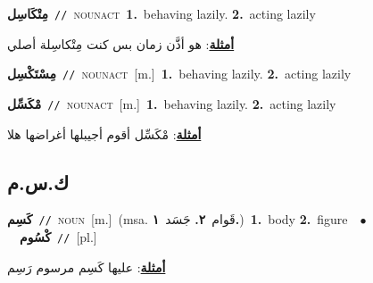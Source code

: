 \documentclass[10pt,a4paper,twoside]{article} %
\begin{document}
\begin{multicols}{2}
{\setlength\topsep{0pt}\textbf{\foreignlanguage{arabic}{مِتْكَاسِل}}\ {\color{gray}\texttt{//}\color{black}}\ \textsc{noun\textunderscore act}\ \textbf{1.}~behaving lazily.  \textbf{2.}~acting lazily\  \begin{flushright}\color{gray}\foreignlanguage{arabic}{\textbf{\underline{\foreignlanguage{arabic}{أمثلة}}}: هو أذَّن زمان بس كنت مِتْكاسِلة أصلي}\end{flushright}\color{black}} \vspace{2mm}

{\setlength\topsep{0pt}\textbf{\foreignlanguage{arabic}{مِسْتَكْسِل}}\ {\color{gray}\texttt{//}\color{black}}\ \textsc{noun\textunderscore act}\ [m.]\ \textbf{1.}~behaving lazily.  \textbf{2.}~acting lazily\ } \vspace{2mm}

{\setlength\topsep{0pt}\textbf{\foreignlanguage{arabic}{مْكَسِّل}}\ {\color{gray}\texttt{//}\color{black}}\ \textsc{noun\textunderscore act}\ [m.]\ \textbf{1.}~behaving lazily.  \textbf{2.}~acting lazily\  \begin{flushright}\color{gray}\foreignlanguage{arabic}{\textbf{\underline{\foreignlanguage{arabic}{أمثلة}}}: مْكَسِّل أقوم أجيبلها أغراضها هلا}\end{flushright}\color{black}} \vspace{2mm}

\vspace{-3mm}
\subsection*{\color{blue}\foreignlanguage{arabic}{ك.س.م}\color{blue}{}} 

{\setlength\topsep{0pt}\textbf{\foreignlanguage{arabic}{كَسِم}}\ {\color{gray}\texttt{//}\color{black}}\ \textsc{noun}\ [m.]\ \color{gray}(msa. \foreignlanguage{arabic}{قَوام}~\foreignlanguage{arabic}{\textbf{٢.}}  \foreignlanguage{arabic}{جَسَد}~\foreignlanguage{arabic}{\textbf{١.}})\color{black}\ \textbf{1.}~body  \textbf{2.}~figure\ \ $\bullet$\ \ \setlength\topsep{0pt}\textbf{\foreignlanguage{arabic}{كْسُوم}}\ {\color{gray}\texttt{//}\color{black}}\ [pl.]\  \begin{flushright}\color{gray}\foreignlanguage{arabic}{\textbf{\underline{\foreignlanguage{arabic}{أمثلة}}}: عليها كَسِم مرسوم رَسِم}\end{flushright}\color{black}} \vspace{2mm}


\end{multicols}
\end{document}
